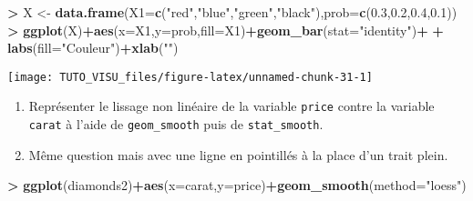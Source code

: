 \documentclass[]{book}
\newenvironment{Shaded}{\begin{snugshade}}{\end{snugshade}}
\newcommand{\DataTypeTok}[1]{\textcolor[rgb]{0.13,0.29,0.53}{#1}}
\newcommand{\FloatTok}[1]{\textcolor[rgb]{0.00,0.00,0.81}{#1}}
\newcommand{\KeywordTok}[1]{\textcolor[rgb]{0.13,0.29,0.53}{\textbf{#1}}}
\newcommand{\NormalTok}[1]{#1}
\newcommand{\OperatorTok}[1]{\textcolor[rgb]{0.81,0.36,0.00}{\textbf{#1}}}
\newcommand{\StringTok}[1]{\textcolor[rgb]{0.31,0.60,0.02}{#1}}
\providecommand{\tightlist}{%
  \setlength{\itemsep}{0pt}\setlength{\parskip}{0pt}}
\theoremstyle{definition}
\theoremstyle{definition}
\theoremstyle{definition}
\theoremstyle{remark}
\let\BeginKnitrBlock\begin \let\EndKnitrBlock\end
\begin{document}
\begin{Shaded}
\begin{Highlighting}[]
\OperatorTok{>}\StringTok{ }\NormalTok{X <-}\StringTok{ }\KeywordTok{data.frame}\NormalTok{(}\DataTypeTok{X1=}\KeywordTok{c}\NormalTok{(}\StringTok{"red"}\NormalTok{,}\StringTok{"blue"}\NormalTok{,}\StringTok{"green"}\NormalTok{,}\StringTok{"black"}\NormalTok{),}\DataTypeTok{prob=}\KeywordTok{c}\NormalTok{(}\FloatTok{0.3}\NormalTok{,}\FloatTok{0.2}\NormalTok{,}\FloatTok{0.4}\NormalTok{,}\FloatTok{0.1}\NormalTok{))}
\OperatorTok{>}\StringTok{ }\KeywordTok{ggplot}\NormalTok{(X)}\OperatorTok{+}\KeywordTok{aes}\NormalTok{(}\DataTypeTok{x=}\NormalTok{X1,}\DataTypeTok{y=}\NormalTok{prob,}\DataTypeTok{fill=}\NormalTok{X1)}\OperatorTok{+}\KeywordTok{geom_bar}\NormalTok{(}\DataTypeTok{stat=}\StringTok{"identity"}\NormalTok{)}\OperatorTok{+}
\OperatorTok{+}\StringTok{   }\KeywordTok{labs}\NormalTok{(}\DataTypeTok{fill=}\StringTok{"Couleur"}\NormalTok{)}\OperatorTok{+}\KeywordTok{xlab}\NormalTok{(}\StringTok{""}\NormalTok{)}
\end{Highlighting}
\end{Shaded}

\begin{center}\texttt{[image: TUTO\_VISU\_files/figure-latex/unnamed-chunk-31-1]} \end{center}

\BeginKnitrBlock{exercise}[Lissage]
\protect\hypertarget{exr:exo-stat2}{}{\label{exr:exo-stat2} \iffalse (Lissage) \fi{} }
\EndKnitrBlock{exercise}

\begin{enumerate}
\def\labelenumi{\arabic{enumi}.}
\tightlist
\item
  Représenter le lissage non linéaire de la variable \texttt{price} contre la variable \texttt{carat} à l'aide de \texttt{geom\_smooth} puis de \texttt{stat\_smooth}.
\item
  Même question mais avec une ligne en pointillés à la place d'un trait plein.
\end{enumerate}

\begin{Shaded}
\begin{Highlighting}[]
\OperatorTok{>}\StringTok{ }\KeywordTok{ggplot}\NormalTok{(diamonds2)}\OperatorTok{+}\KeywordTok{aes}\NormalTok{(}\DataTypeTok{x=}\NormalTok{carat,}\DataTypeTok{y=}\NormalTok{price)}\OperatorTok{+}\KeywordTok{geom_smooth}\NormalTok{(}\DataTypeTok{method=}\StringTok{"loess"}\NormalTok{)}
\end{Highlighting}
\end{Shaded}
\end{document}
